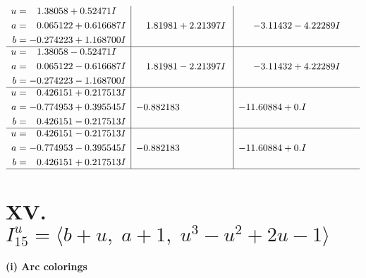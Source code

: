 \documentclass[1p]{elsarticle_modified}
\theoremstyle{definition}
\begin{document}
$$\begin{array}{c|c|c}
\begin{aligned}
u &= \phantom{-}1.38058 + 0.52471 I \\
a &= \phantom{-}0.065122 + 0.616687 I \\
b &= -0.274223 + 1.168700 I\end{aligned}
 & \phantom{-}1.81981 + 2.21397 I & -3.11432 - 4.22289 I \\ \hline\begin{aligned}
u &= \phantom{-}1.38058 - 0.52471 I \\
a &= \phantom{-}0.065122 - 0.616687 I \\
b &= -0.274223 - 1.168700 I\end{aligned}
 & \phantom{-}1.81981 - 2.21397 I & -3.11432 + 4.22289 I \\ \hline\begin{aligned}
u &= \phantom{-}0.426151 + 0.217513 I \\
a &= -0.774953 + 0.395545 I \\
b &= \phantom{-}0.426151 - 0.217513 I\end{aligned}
 & -0.882183\phantom{ +0.000000I} & -11.60884 + 0. I\phantom{ +0.000000I} \\ \hline\begin{aligned}
u &= \phantom{-}0.426151 - 0.217513 I \\
a &= -0.774953 - 0.395545 I \\
b &= \phantom{-}0.426151 + 0.217513 I\end{aligned}
 & -0.882183\phantom{ +0.000000I} & -11.60884 + 0. I\phantom{ +0.000000I}\\
 \hline 
 \end{array}$$\newpage\newpage\renewcommand{\arraystretch}{1}
\centering \section*{XV. $I^u_{15}= \langle b+u,\;a+1,\;u^3- u^2+2 u-1 \rangle$}
\flushleft \textbf{(i) Arc colorings}\\
\end{document}
